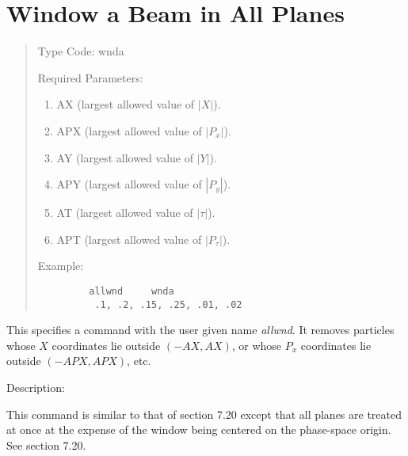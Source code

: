 \section{Window a Beam in All Planes}
\begin{quotation}
\noindent Type Code:  wnda 
\vspace{5mm}

\noindent Required Parameters:
\begin{enumerate}
      \item  AX (largest allowed value of $|X|$).

	  \item  APX (largest allowed value of $|P_x|$).

      \item  AY (largest allowed value of $|Y|$).

      \item  APY (largest allowed value of $|P_y|$).

      \item  AT (largest allowed value of $|\tau |$).

	  \item  APT (largest allowed value of $|P_{\tau}|$).
\end{enumerate}

\vspace{5mm}
\noindent Example:
\begin{verbatim}
         allwnd     wnda
          .1, .2, .15, .25, .01, .02
\end{verbatim}
\end{quotation}
This specifies a command with the user given name {\em allwnd}.  It removes particles whose $X$ coordinates lie outside $(-AX,AX)$, or whose $P_x$ coordinates lie outside $(-APX,APX)$, etc.

\vspace{5mm}
     Description:
\vspace{2mm}

\noindent This command is similar to that of section 7.20 except that all planes are treated at once at the expense of the window being centered on the phase-space origin.  See section 7.20.

\newpage
